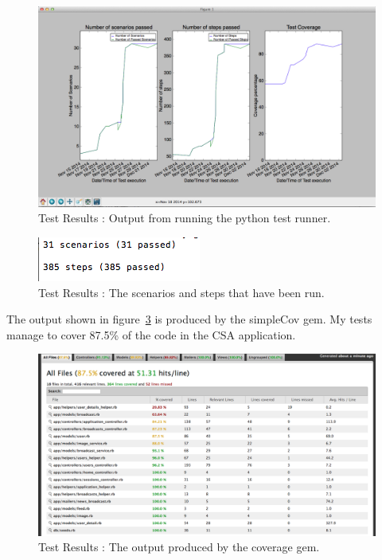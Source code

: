 \documentclass[10pt,a4paper,titlepage]{article}
\begin{document}
\begin{figure}[H]
\begin{center}
\includegraphics[scale=0.35]{include/graphOutput.png}  
\caption{Test Results : Output from running the python test runner. }
\label{fig:graphOutput}
\end{center}
\end{figure}

\begin{figure}[H]
\begin{center}
\includegraphics[scale=1.0]{include/cucumber_results.png}  
\caption{Test Results : The scenarios and steps that have been run. }
\label{fig:cucumberOutput}
\end{center}
\end{figure}

The output shown in figure~\ref{fig:coverageOutput} is produced by the simpleCov gem. My tests manage to cover 87.5\% of the code in the CSA application. 

\begin{figure}[H]
\begin{center}
\includegraphics[scale=0.35]{include/coverage.png}  
\caption{Test Results : The output produced by the coverage gem. }
\label{fig:coverageOutput}
\end{center}
\end{figure}
\end{document}
